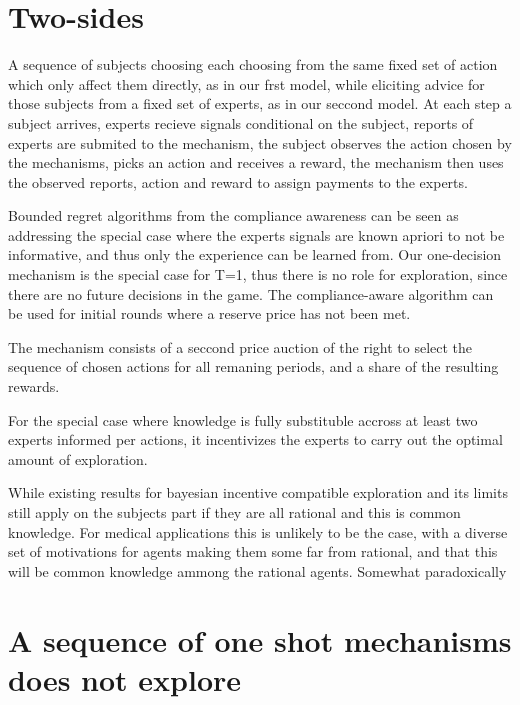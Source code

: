 \section{Two-sides}

 A sequence of subjects choosing each choosing from the same fixed set of action which only affect them directly, as in our frst model, while eliciting advice for those subjects from a fixed set of experts, as in our seccond model. 
At each step a subject arrives, experts recieve signals conditional on the subject, reports of experts are submited to the mechanism, the subject observes the action chosen by the mechanisms, picks an action and receives a reward, the mechanism then uses the observed reports, action and reward to assign payments to the experts.

Bounded regret algorithms from the compliance awareness can be seen as addressing the special case where the experts signals are known apriori to not be informative, and thus only the experience can be learned from. Our one-decision mechanism is the special case for T=1, thus there is no role for exploration, since there are no future decisions in the game.
The compliance-aware algorithm can be used for initial rounds where a reserve price has not been met.

The mechanism consists of a seccond price auction of the right to select the sequence of chosen actions for all remaning periods, and a share of the resulting rewards.

For the special case where knowledge is  fully substituble accross at least two experts informed per actions, it incentivizes the experts to carry out the optimal amount of exploration. 

While existing results for bayesian incentive compatible exploration and its limits still apply on the subjects part if they are all rational and this is common knowledge. For medical applications this is unlikely to be the case, with a diverse set of motivations for agents making them some far from rational, and that this will be common knowledge ammong the rational agents. Somewhat paradoxically 



\section{A sequence of one shot mechanisms does not explore}

